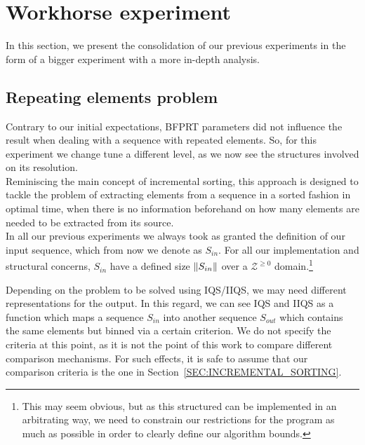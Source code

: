 \chapter{Workhorse experiment}
\label{CHAPTER:WORKHORSE_EXPERIMENT}

In this section, we present the consolidation of our previous experiments in the form of a bigger experiment with a more in-depth analysis.\\

\section{Repeating elements problem}
\label{SECTION:STACK_STRUCTURE}

Contrary to our initial expectations, BFPRT parameters did not influence the result when dealing with a sequence with repeated elements. So, for this experiment we change tune a different level, as we now see the structures involved on its resolution.\\

Reminiscing the main concept of incremental sorting, this approach is designed to tackle the problem of extracting elements from a sequence in a sorted fashion in optimal time, when there is no information beforehand on how many elements are needed to be extracted from its source.\\

In all our previous experiments we always took as granted the definition of our input sequence, which from now we denote as $S_{in}$. For all our implementation and structural concerns, $S_{in}$  have a defined size $\lVert S_{in}\rVert$ over a $\mathcal{Z}^{\geq0}$ domain.\footnote{This may seem obvious, but as this structured can be implemented in an arbitrating way, we need to constrain our restrictions for the program as much as possible in order to clearly define our algorithm bounds.} 

Depending on the problem to be solved using IQS/IIQS, we may need different representations for the output. In this regard, we can see IQS and IIQS as a function which maps a sequence $S_{in}$ into another sequence $S_{out}$ which contains the same elements but binned via a certain criterion. We do not specify the criteria at this point, as it is not the point of this work to compare different comparison mechanisms. For such effects, it is safe to assume that our comparison criteria is the one in Section~\ref{SEC:INCREMENTAL_SORTING}.\\

